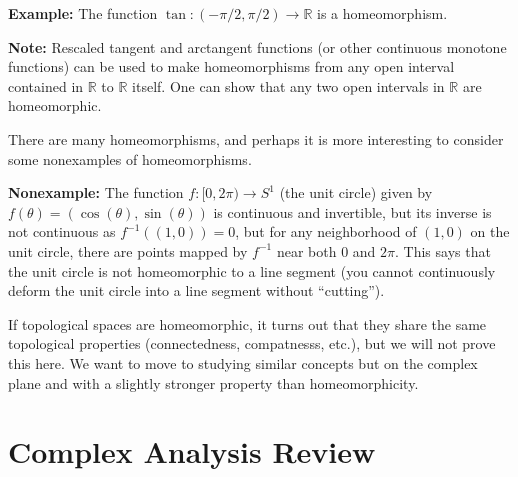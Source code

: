 \noindent\textbf{Example: }The function $\tan: (-\pi/2,\pi/2)\to\mathbb{R}$ is a homeomorphism.


\noindent \textbf{Note: }Rescaled tangent and arctangent functions (or other continuous monotone functions) can be used to make homeomorphisms from any open interval contained in $\mathbb{R}$ to $\mathbb{R}$ itself. One can show that any two open intervals in $\mathbb{R}$ are homeomorphic.

\noindent There are many homeomorphisms, and perhaps it is more interesting to consider some nonexamples of homeomorphisms.

\noindent \textbf{Nonexample: }
    The function $f:[0,2\pi)\to S^1$ (the unit circle) given by $f(\theta)=(\cos(\theta),\sin(\theta))$ is continuous and invertible, but its inverse is not continuous as $f^{-1}((1,0))=0$, but for any neighborhood of $(1,0)$ on the unit circle, there are points mapped by $f^{-1}$ near both $0$ and $2\pi$. This says that the unit circle is not homeomorphic to a line segment (you cannot continuously deform the unit circle into a line segment without ``cutting'').

\noindent If topological spaces are homeomorphic, it turns out that they share the same topological properties (connectedness, compatnesss, etc.), but we will not prove this here. We want to move to studying similar concepts but on the complex plane and with a slightly stronger property than homeomorphicity.

\section{Complex Analysis Review}

